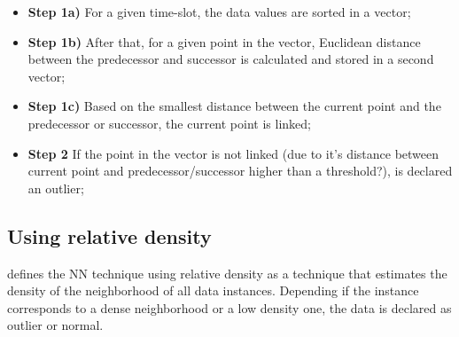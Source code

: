 \begin{itemize}

	\setlength\itemsep{-0.5em}

	\item \textbf{Step 1a)} For a given time-slot, the data values are sorted in a vector;

	\item \textbf{Step 1b)} After that, for a given point in the vector, Euclidean distance between the predecessor and successor is calculated and stored in a second vector;

	\item \textbf{Step 1c)} Based on the smallest distance between the current point and the predecessor or successor, the current point is linked;

	\item \textbf{Step 2} If the point in the vector is not linked (due to it's distance between current point and predecessor/successor higher than a threshold?), is declared an outlier;

\end{itemize}





\subsection{Using relative density}

\cite{gen:chandola:2009} defines the NN technique using relative density as a technique that estimates the density of the neighborhood of all data instances. Depending if the instance corresponds to a dense neighborhood or a low density one, the data is declared as outlier or normal.
